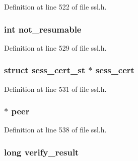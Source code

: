 Definition at line 522 of file ssl.\+h.

\subsubsection[{\texorpdfstring{not\+\_\+resumable}{not_resumable}}]{\setlength{\rightskip}{0pt plus 5cm}int not\+\_\+resumable}\hypertarget{structssl__session__st_a2d8794bcc5dc992777e8ceccac831d92}{}\label{structssl__session__st_a2d8794bcc5dc992777e8ceccac831d92}


Definition at line 529 of file ssl.\+h.

\subsubsection[{\texorpdfstring{sess\+\_\+cert}{sess_cert}}]{\setlength{\rightskip}{0pt plus 5cm}struct {\bf sess\+\_\+cert\+\_\+st} $\ast$ sess\+\_\+cert}\hypertarget{structssl__session__st_ae1063dff5662b52a02fedf6c0f4faf6e}{}\label{structssl__session__st_ae1063dff5662b52a02fedf6c0f4faf6e}


Definition at line 531 of file ssl.\+h.

\subsubsection[{\texorpdfstring{peer}{peer}}]{ $\ast$ peer}\hypertarget{structssl__session__st_a42b8ed817107b1f2f9543890d6a8cc9b}{}\label{structssl__session__st_a42b8ed817107b1f2f9543890d6a8cc9b}


Definition at line 538 of file ssl.\+h.

\subsubsection[{\texorpdfstring{verify\+\_\+result}{verify_result}}]{\setlength{\rightskip}{0pt plus 5cm}long verify\+\_\+result}\hypertarget{structssl__session__st_a84b50be28bacc0340589457fc52d554a}{}\label{structssl__session__st_a84b50be28bacc0340589457fc52d554a}



